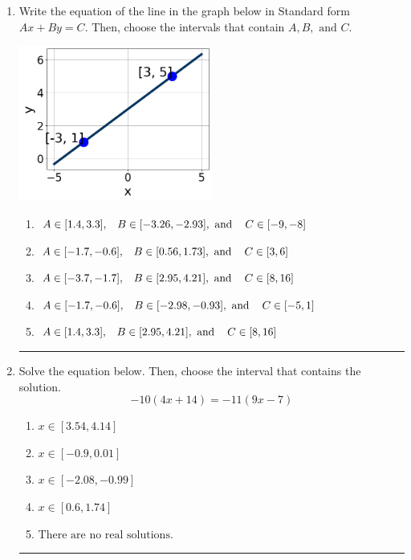 \documentclass[14pt]{extbook}
\newcommand{\litem}[1]{\item#1\hspace*{-1cm}\rule{\textwidth}{0.4pt}}
\begin{document}
\begin{enumerate}
{\begin{enumerate}[label=\Alph*.]
\end{enumerate} }
\litem{
Write the equation of the line in the graph below in Standard form $Ax+By=C$. Then, choose the intervals that contain $A, B, \text{ and } C$.
\begin{center}
    \includegraphics[width=0.5\textwidth]{../Figures/linearGraphToStandardA.png}
\end{center}
\begin{enumerate}[label=\Alph*.]
\item \( A \in [1.4, 3.3], \hspace{3mm} B \in [-3.26, -2.93], \text{ and } \hspace{3mm} C \in [-9, -8] \)
\item \( A \in [-1.7, -0.6], \hspace{3mm} B \in [0.56, 1.73], \text{ and } \hspace{3mm} C \in [3, 6] \)
\item \( A \in [-3.7, -1.7], \hspace{3mm} B \in [2.95, 4.21], \text{ and } \hspace{3mm} C \in [8, 16] \)
\item \( A \in [-1.7, -0.6], \hspace{3mm} B \in [-2.98, -0.93], \text{ and } \hspace{3mm} C \in [-5, 1] \)
\item \( A \in [1.4, 3.3], \hspace{3mm} B \in [2.95, 4.21], \text{ and } \hspace{3mm} C \in [8, 16] \)

\end{enumerate} }
\litem{
Solve the equation below. Then, choose the interval that contains the solution.\[ -10(4x + 14) = -11(9x -7) \]\begin{enumerate}[label=\Alph*.]
\item \( x \in [3.54, 4.14] \)
\item \( x \in [-0.9, 0.01] \)
\item \( x \in [-2.08, -0.99] \)
\item \( x \in [0.6, 1.74] \)
\item \( \text{There are no real solutions.} \)

\end{enumerate} }
\end{enumerate}
\end{document}

